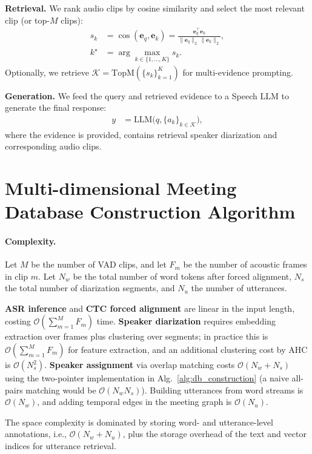 \documentclass[11pt]{article}
\begin{document}
\textbf{Retrieval.}
We rank audio clips by cosine similarity and select the most relevant clip (or top-$M$ clips):
\begin{align}
s_k &= \cos(\mathbf{e}_q, \mathbf{e}_k) = \frac{\mathbf{e}_q^\top \mathbf{e}_k}{\|\mathbf{e}_q\|_2\,\|\mathbf{e}_k\|_2}, \\
k^\star &= \arg\max_{k \in \{1,\dots,K\}} s_k.
\end{align}
Optionally, we retrieve $\mathcal{K}=\text{TopM}(\{s_k\}_{k=1}^K)$ for multi-evidence prompting.

\textbf{Generation.}
We feed the query and retrieved evidence to a Speech LLM to generate the final response:
\begin{align}
y &= \text{LLM}\big(q, \{a_k\}_{k \in \mathcal{K}}\big),
\end{align}
where the evidence is provided, contains retrieval speaker diarization and corresponding audio clips.

\section{Multi-dimensional Meeting Database Construction Algorithm}

\paragraph{Complexity.}
Let $M$ be the number of VAD clips, and let $F_m$ be the number of acoustic frames in clip $m$.
Let $N_w$ be the total number of word tokens after forced alignment, $N_s$ the total number of diarization segments, and $N_u$ the number of utterances.

\textbf{ASR inference} and \textbf{CTC forced alignment} are linear in the input length, costing
$\mathcal{O}\!\left(\sum_{m=1}^{M} F_m\right)$ time.
\textbf{Speaker diarization} requires embedding extraction over frames plus clustering over segments; in practice this is
$\mathcal{O}\!\left(\sum_{m=1}^{M} F_m\right)$ for feature extraction, and an additional clustering cost by AHC is $\mathcal{O}(N_s^2)$.
\textbf{Speaker assignment} via overlap matching costs $\mathcal{O}(N_w+N_s)$ using the two-pointer implementation in Alg.~\ref{alg:db_construction} (a naive all-pairs matching would be $\mathcal{O}(N_wN_s)$).
Building utterances from word streams is $\mathcal{O}(N_w)$, and adding temporal edges in the meeting graph is $\mathcal{O}(N_u)$.

The space complexity is dominated by storing word- and utterance-level annotations, i.e., $\mathcal{O}(N_w+N_u)$, plus the storage overhead of the text and vector indices for utterance retrieval.
\end{document}
